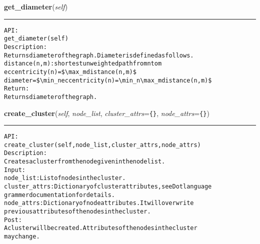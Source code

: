    \label{coinor:gimpy:graph:Graph:get_diameter}

    \vspace{0.5ex}

\hspace{.8\funcindent}\begin{boxedminipage}{\funcwidth}

    \raggedright \textbf{get\_diameter}(\textit{self})

    \vspace{-1.5ex}

    \rule{\textwidth}{0.5\fboxrule}
\setlength{\parskip}{2ex}
\begin{alltt}

API:
    get\_diameter(self)
Description:
    Returns diameter of the graph. Diameter is defined as follows.
    distance(n,m): shortest unweighted path from n to m
    eccentricity(n) = \${\textbackslash}max \_m distance(n,m)\$
    diameter = \${\textbackslash}min \_n eccentricity(n) = {\textbackslash}min \_n {\textbackslash}max \_m distance(n,m)\$
Return:
    Returns diameter of the graph.
\end{alltt}

\setlength{\parskip}{1ex}
    \end{boxedminipage}

    \label{coinor:gimpy:graph:Graph:create_cluster}

    \vspace{0.5ex}

\hspace{.8\funcindent}\begin{boxedminipage}{\funcwidth}

    \raggedright \textbf{create\_cluster}(\textit{self}, \textit{node\_list}, \textit{cluster\_attrs}={\tt \texttt{\{}\texttt{\}}}, \textit{node\_attrs}={\tt \texttt{\{}\texttt{\}}})

    \vspace{-1.5ex}

    \rule{\textwidth}{0.5\fboxrule}
\setlength{\parskip}{2ex}
\begin{alltt}

API:
    create\_cluster(self, node\_list, cluster\_attrs, node\_attrs)
Description:
    Creates a cluster from the node given in the node list.
Input:
    node\_list: List of nodes in the cluster.
    cluster\_attrs: Dictionary of cluster attributes, see Dot language
    grammer documentation for details.
    node\_attrs: Dictionary of node attributes. It will overwrite
    previous attributes of the nodes in the cluster.
Post:
    A cluster will be created. Attributes of the nodes in the cluster
    may change.
\end{alltt}

\setlength{\parskip}{1ex}
    \end{boxedminipage}


